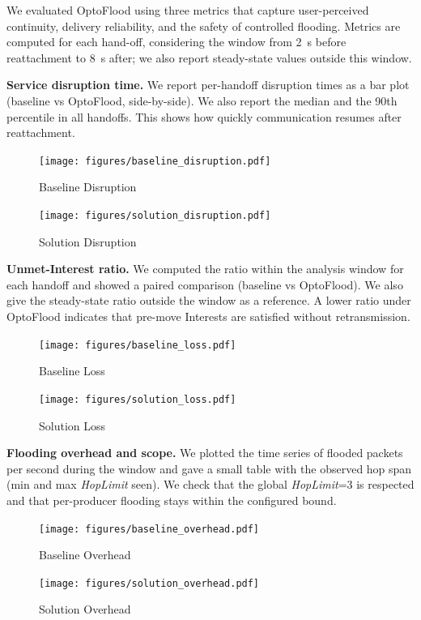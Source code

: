 \documentclass[10pt,conference]{IEEEtran}
\begin{document}
We evaluated OptoFlood using three metrics that capture user-perceived continuity, delivery reliability, and the safety of controlled flooding. 
Metrics are computed for each hand-off, considering the window from 2~s before reattachment to 8~s after; we also report steady-state values outside this window.

\textbf{Service disruption time.}
We report per-handoff disruption times as a bar plot (baseline vs OptoFlood, side-by-side). We also report the median and the 90th percentile in all handoffs. This shows how quickly communication resumes after reattachment.
\begin{figure}
    \centering
    \texttt{[image: figures/baseline\_disruption.pdf]}
    \caption{Baseline Disruption}
    \label{fig:baseline_disruption}
\end{figure}
\begin{figure}
    \centering
    \texttt{[image: figures/solution\_disruption.pdf]}
    \caption{Solution Disruption}
    \label{fig:solution_disruption}
\end{figure}

\textbf{Unmet-Interest ratio.}
We computed the ratio within the analysis window for each handoff and showed a paired comparison (baseline vs OptoFlood). We also give the steady-state ratio outside the window as a reference. A lower ratio under OptoFlood indicates that pre-move Interests are satisfied without retransmission.
\begin{figure}
    \centering
    \texttt{[image: figures/baseline\_loss.pdf]}
    \caption{Baseline Loss}
    \label{fig:baseline_loss}
\end{figure}
\begin{figure}
    \centering
    \texttt{[image: figures/solution\_loss.pdf]}
    \caption{Solution Loss}
    \label{fig:solution_loss}
\end{figure}

\textbf{Flooding overhead and scope.}
We plotted the time series of flooded packets per second during the window and gave a small table with the observed hop span (min and max \textit{HopLimit} seen). We check that the global \textit{HopLimit}=3 is respected and that per-producer flooding stays within the configured bound.
\begin{figure}
    \centering
    \texttt{[image: figures/baseline\_overhead.pdf]}
    \caption{Baseline Overhead}
    \label{fig:baseline_overhead}
\end{figure}
\begin{figure}
    \centering
    \texttt{[image: figures/solution\_overhead.pdf]}
    \caption{Solution Overhead}
    \label{fig:solution_overhead}
\end{figure}
\end{document}
